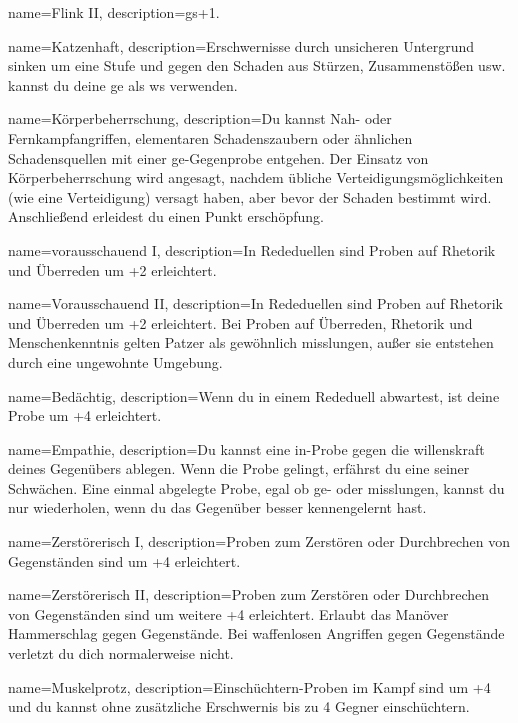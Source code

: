 {
    name={Flink II},
    description={\gls{gs}+1.}}

{
    name={Katzenhaft},
    description={Erschwernisse durch unsicheren Untergrund sinken um eine Stufe und gegen den Schaden aus Stürzen, Zusammenstößen usw. kannst du deine \gls{ge} als \gls{ws} verwenden.}}

{
    name={Körperbeherrschung},
    description={Du kannst Nah- oder Fernkampfangriffen, elementaren Schadenszaubern oder ähnlichen Schadensquellen mit einer \gls{ge}-Gegenprobe entgehen. Der Einsatz von Körperbeherrschung wird angesagt, nachdem übliche Verteidigungsmöglichkeiten (wie eine Verteidigung) versagt haben, aber bevor der Schaden bestimmt wird. Anschließend erleidest du einen Punkt \gls{erschöpfung}.}}

{
    name={vorausschauend I},
    description={In Rededuellen sind Proben auf Rhetorik und Überreden um +2 erleichtert.}}

{
    name={Vorausschauend II},
    description={In Rededuellen sind Proben auf Rhetorik und Überreden um +2 erleichtert. Bei Proben auf Überreden, Rhetorik und Menschenkenntnis gelten Patzer als gewöhnlich misslungen, außer sie entstehen durch eine ungewohnte Umgebung.}}

{
    name={Bedächtig},
    description={Wenn du in einem Rededuell abwartest, ist deine Probe um +4 erleichtert.}}

{
    name={Empathie},
    description={Du kannst eine \gls{in}-Probe gegen die \gls{willenskraft} deines Gegenübers ablegen. Wenn die Probe gelingt, erfährst du eine seiner Schwächen. Eine einmal abgelegte Probe, egal ob ge- oder misslungen, kannst du nur wiederholen, wenn du das Gegenüber besser kennengelernt hast.}}

{
    name={Zerstörerisch I},
    description={Proben zum Zerstören oder Durchbrechen von Gegenständen sind um +4 erleichtert.}}

{
    name={Zerstörerisch II},
    description={Proben zum Zerstören oder Durchbrechen von Gegenständen sind um weitere +4 erleichtert. Erlaubt das Manöver Hammerschlag gegen
Gegenstände. Bei waffenlosen Angriffen gegen Gegenstände verletzt du dich normalerweise nicht.}}

{
    name={Muskelprotz},
    description={Einschüchtern-Proben im Kampf sind um +4 und du kannst ohne zusätzliche Erschwernis bis zu 4 Gegner einschüchtern.}}

